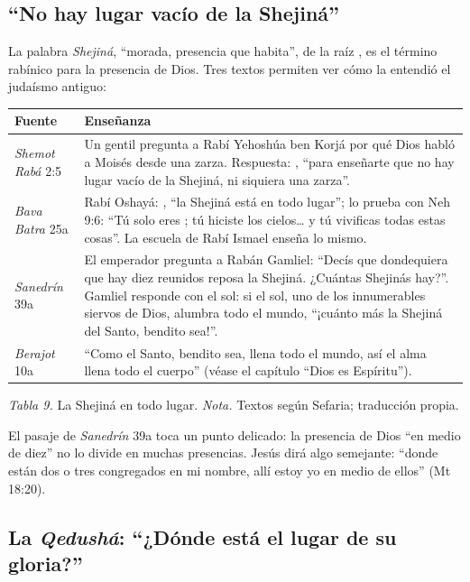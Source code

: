 \subsection{“No hay lugar vacío de la Shejiná”}

La palabra  \emph{Shejiná}, ``morada, presencia que habita'', de la raíz , es el término rabínico para la presencia de Dios. Tres textos permiten ver cómo la entendió el judaísmo antiguo:

\begin{center}\small\renewcommand{\arraystretch}{1.22}
\begin{tabular}{@{}L{3.0cm}L{11.0cm}@{}}
\toprule
\textbf{Fuente} & \textbf{Enseñanza} \\ \midrule
\emph{Shemot Rabá} 2:5 & Un gentil pregunta a Rabí Yehoshúa ben Korjá por qué Dios habló a Moisés desde una zarza. Respuesta: , ``para enseñarte que no hay lugar vacío de la Shejiná, ni siquiera una zarza''. \\
\emph{Bava Batra} 25a & Rabí Oshayá: , ``la Shejiná está en todo lugar''; lo prueba con Neh 9:6: ``Tú solo eres \SENOR{}; tú hiciste los cielos\ldots{} y tú vivificas todas estas cosas''. La escuela de Rabí Ismael enseña lo mismo. \\
\emph{Sanedrín} 39a & El emperador pregunta a Rabán Gamliel: ``Decís que dondequiera que hay diez reunidos reposa la Shejiná. ¿Cuántas Shejinás hay?''. Gamliel responde con el sol: si el sol, uno de los innumerables siervos de Dios, alumbra todo el mundo, ``¡cuánto más la Shejiná del Santo, bendito sea!''. \\
\emph{Berajot} 10a & ``Como el Santo, bendito sea, llena todo el mundo, así el alma llena todo el cuerpo'' (véase el capítulo ``Dios es Espíritu''). \\
\bottomrule
\end{tabular}\par
{\footnotesize\color{gris}\textit{Tabla 9.} La Shejiná en todo lugar. \textit{Nota.} Textos según Sefaria; traducción propia.}
\end{center}

El pasaje de \emph{Sanedrín} 39a toca un punto delicado: la presencia de Dios ``en medio de diez'' no lo divide en muchas presencias. Jesús dirá algo semejante: ``donde están dos o tres congregados en mi nombre, allí estoy yo en medio de ellos'' (Mt 18:20).

\subsection{La \emph{Qedushá}: “¿Dónde está el lugar de su gloria?”}

